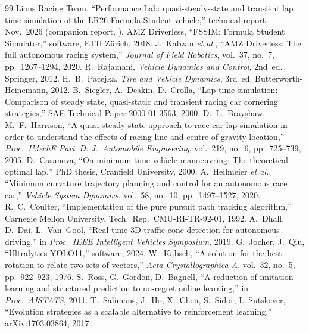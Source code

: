 \documentclass[11pt]{article}
\begin{document}
\begin{thebibliography}{99}\small
{} Lions Racing Team, ``Performance Lab: quasi-steady-state and transient lap time simulation of
the LR26 Formula Student vehicle,'' technical report, Nov.~2026 (companion report, ).
 AMZ Driverless, ``FSSIM: Formula Student Simulator,'' software, ETH Zürich, 2018.
 J.~Kabzan \emph{et al.}, ``AMZ Driverless: The full autonomous racing system,''
\emph{Journal of Field Robotics}, vol.~37, no.~7, pp.~1267--1294, 2020.
 R.~Rajamani, \emph{Vehicle Dynamics and Control}, 2nd~ed. Springer, 2012.
 H.~B.~Pacejka, \emph{Tire and Vehicle Dynamics}, 3rd~ed. Butterworth-Heinemann, 2012.
 B.~Siegler, A.~Deakin, D.~Crolla, ``Lap time simulation: Comparison of steady state,
quasi-static and transient racing car cornering strategies,'' SAE Technical Paper 2000-01-3563, 2000.
 D.~L.~Brayshaw, M.~F.~Harrison, ``A quasi steady state approach to race car lap simulation
in order to understand the effects of racing line and centre of gravity location,'' \emph{Proc.\ IMechE Part~D:
J.\ Automobile Engineering}, vol.~219, no.~6, pp.~725--739, 2005.
 D.~Casanova, ``On minimum time vehicle manoeuvring: The theoretical optimal lap,''
PhD thesis, Cranfield University, 2000.
 A.~Heilmeier \emph{et al.}, ``Minimum curvature trajectory planning and control for an
autonomous race car,'' \emph{Vehicle System Dynamics}, vol.~58, no.~10, pp.~1497--1527, 2020.
 R.~C.~Coulter, ``Implementation of the pure pursuit path tracking algorithm,'' Carnegie
Mellon University, Tech.\ Rep.\ CMU-RI-TR-92-01, 1992.
 A.~Dhall, D.~Dai, L.~Van~Gool, ``Real-time 3D traffic cone detection for autonomous driving,''
in \emph{Proc.\ IEEE Intelligent Vehicles Symposium}, 2019.
 G.~Jocher, J.~Qiu, ``Ultralytics YOLO11,'' software, 2024.
 W.~Kabsch, ``A solution for the best rotation to relate two sets of vectors,''
\emph{Acta Crystallographica A}, vol.~32, no.~5, pp.~922--923, 1976.
 S.~Ross, G.~Gordon, D.~Bagnell, ``A reduction of imitation learning and structured prediction to
no-regret online learning,'' in \emph{Proc.\ AISTATS}, 2011.
 T.~Salimans, J.~Ho, X.~Chen, S.~Sidor, I.~Sutskever, ``Evolution strategies as a scalable
alternative to reinforcement learning,'' arXiv:1703.03864, 2017.

\end{thebibliography}
\end{document}

